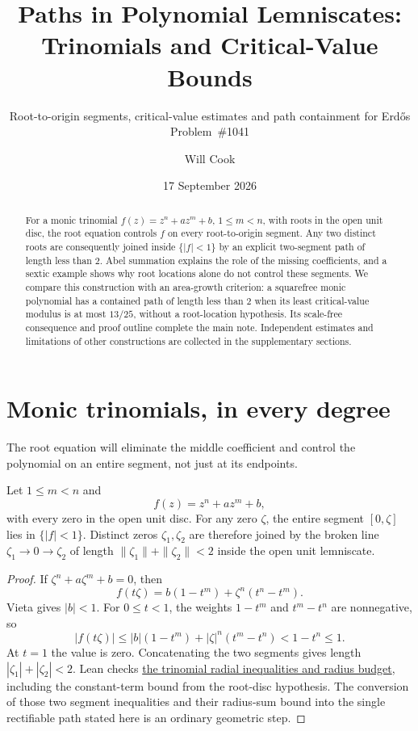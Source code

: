 \documentclass[11pt]{article}
\title{Paths in Polynomial Lemniscates:\\Trinomials and Critical-Value Bounds}
\subtitle{Root-to-origin segments, critical-value estimates and path
containment for Erd\H{o}s Problem~\#1041}
\author{Will Cook}
\date{17 September 2026}
\begin{document}
\maketitle
\noteprovenance

\begin{abstract}
For a monic trinomial $f(z)=z^n+az^m+b$, $1\le m<n$, with roots in the
open unit disc, the root equation controls $f$ on every root-to-origin
segment. Any two distinct roots are consequently joined inside
$\{|f|<1\}$ by an explicit two-segment path of length less than $2$.
Abel summation explains the role of the missing coefficients, and a
sextic example shows why root locations alone do not control these
segments. We compare this construction with an area-growth criterion:
a squarefree monic polynomial has a contained path of length less than
$2$ when its least critical-value modulus is at most $13/25$, without a
root-location hypothesis. Its scale-free consequence and proof outline
complete the main note. Independent estimates and limitations of other
constructions are collected in the supplementary sections.
\end{abstract}

\section{Monic trinomials, in every degree}
\label{sec:trinomial}

The root equation will eliminate the middle coefficient and control
the polynomial on an entire segment, not just at its endpoints.

\begin{theorem}
\label{res:trinomial-all-degree}
Let $1\le m<n$ and
\[
 f(z)=z^n+az^m+b,
\]
with every zero in the open unit disc.  For any zero $\zeta$, the entire
segment $[0,\zeta]$ lies in $\{|f|<1\}$.  Distinct zeros $\zeta_1,\zeta_2$
are therefore joined by the broken line $\zeta_1\to0\to\zeta_2$ of length
$\|\zeta_1\|+\|\zeta_2\|<2$ inside the open unit lemniscate.
\end{theorem}

\begin{proof}
If $\zeta^n+a\zeta^m+b=0$, then
\[
 f(t\zeta)=b(1-t^m)+\zeta^n(t^n-t^m).
\]
Vieta gives $|b|<1$.  For $0\le t<1$, the weights $1-t^m$ and $t^m-t^n$
are nonnegative, so
\[
 |f(t\zeta)|\le |b|(1-t^m)+|\zeta|^n(t^m-t^n)
 <1-t^n\le1.
\]
At $t=1$ the value is zero.  Concatenating the two segments gives length
$|\zeta_1|+|\zeta_2|<2$.
Lean checks \href{https://github.com/wcook04/plectis-erdos/blob/0ba585f632fbbbb43af2ee9532d4e83752af3f67/ErdosProblems/Erdos1041/AbelControlPolygon.lean#L330}{the trinomial radial inequalities and radius budget}, including the constant-term bound from the root-disc hypothesis.
The conversion of those two segment inequalities and their radius-sum bound
into the single rectifiable path stated here is an ordinary geometric step.
\end{proof}
\end{document}
